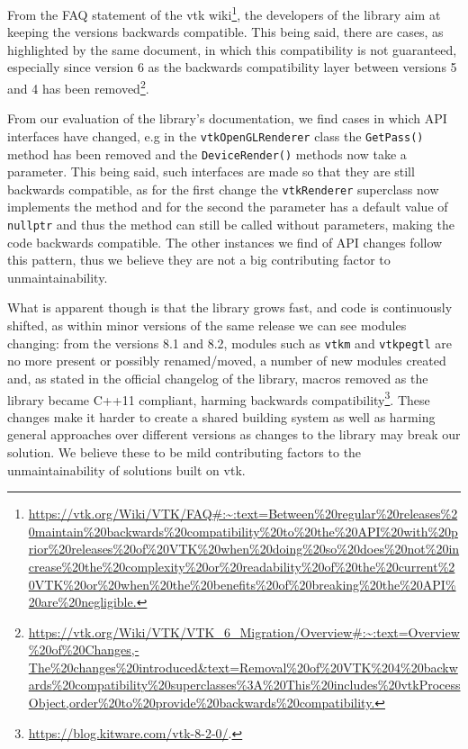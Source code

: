 From the FAQ statement of the \acrshort{vtk} wiki\footnote{\url{https://vtk.org/Wiki/VTK/FAQ\#:~:text=Between\%20regular\%20releases\%20maintain\%20backwards\%20compatibility\%20to\%20the\%20API\%20with\%20prior\%20releases\%20of\%20VTK\%20when\%20doing\%20so\%20does\%20not\%20increase\%20the\%20complexity\%20or\%20readability\%20of\%20the\%20current\%20VTK\%20or\%20when\%20the\%20benefits\%20of\%20breaking\%20the\%20API\%20are\%20negligible.}}, the developers of the library aim at keeping the versions backwards compatible. This being said, there are cases, as highlighted by the same document, in which this compatibility is not guaranteed, especially since version 6 as the backwards compatibility layer between versions 5 and 4 has been removed\footnote{\url{https://vtk.org/Wiki/VTK/VTK_6_Migration/Overview\#:~:text=Overview\%20of\%20Changes,-The\%20changes\%20introduced&text=Removal\%20of\%20VTK\%204\%20backwards\%20compatibility\%20superclasses\%3A\%20This\%20includes\%20vtkProcessObject,order\%20to\%20provide\%20backwards\%20compatibility.}}.

From our evaluation of the library's documentation, we find cases in which API interfaces have changed, e.g in the \verb|vtkOpenGLRenderer| class the \verb|GetPass()| method has been removed and the \verb|DeviceRender()| methods now take a parameter. This being said, such interfaces are made so that they are still backwards compatible, as for the first change the \verb|vtkRenderer| superclass now implements the method and for the second the parameter has a default value of \verb|nullptr| and thus the method can still be called without parameters, making the code backwards compatible. The other instances we find of API changes follow this pattern, thus we believe they are not a big contributing factor to unmaintainability.

What is apparent though is that the library grows fast, and code is continuously shifted, as within minor versions of the same release we can see modules changing: from the versions 8.1 and 8.2, modules such as \verb|vtkm| and \verb|vtkpegtl| are no more present or possibly renamed/moved, a number of new modules created and, as stated in the official changelog of the library, macros removed as the library became C++11 compliant, harming backwards compatibility\footnote{\url{https://blog.kitware.com/vtk-8-2-0/}.}. These changes make it harder to create a shared building system as well as harming general approaches over different versions as changes to the library may break our solution. We believe these to be mild contributing factors to the unmaintainability of solutions built on \acrshort{vtk}.

